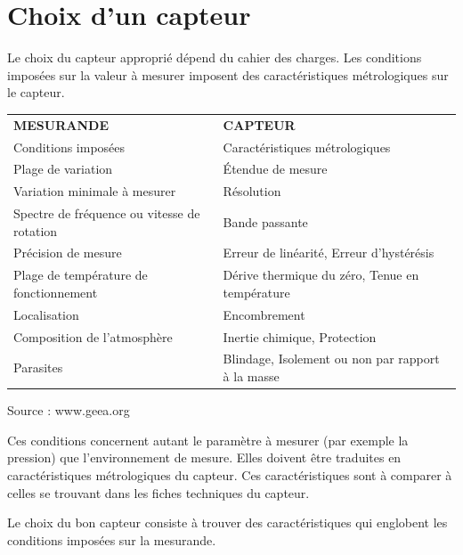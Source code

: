 \section{Choix d'un capteur}

Le choix du capteur approprié dépend du cahier des charges. Les conditions imposées sur la valeur à mesurer imposent des caractéristiques métrologiques sur le capteur.
\begin {center}
\begin{tabular}{|p{6cm}|p{6cm}|}\hline
    \textbf{MESURANDE}                          & \textbf{CAPTEUR}                                  \\
    Conditions imposées                         & Caractéristiques métrologiques                    \\\hline\hline
    Plage de variation                          & Étendue de mesure                                 \\\hline
    Variation minimale à mesurer                & Résolution                                        \\\hline
    Spectre de fréquence ou vitesse de rotation & Bande passante                                    \\\hline
    Précision de mesure                         & Erreur de linéarité, Erreur d'hystérésis          \\\hline
    Plage de température de fonctionnement      & Dérive thermique du zéro, Tenue en température    \\\hline
    Localisation                                & Encombrement                                      \\\hline
    Composition de l'atmosphère                 & Inertie chimique, Protection                      \\\hline
    Parasites                                   & Blindage, Isolement ou non par rapport à la masse \\\hline
\end{tabular}
\end{center}
Source : www.geea.org

Ces conditions concernent autant le paramètre à mesurer (par exemple la pression) que l'environnement de mesure. Elles doivent être traduites en caractéristiques métrologiques du capteur. Ces caractéristiques sont à comparer à celles se trouvant dans les fiches techniques du capteur.

Le choix du bon capteur consiste à trouver des caractéristiques qui englobent les conditions imposées sur la mesurande.

